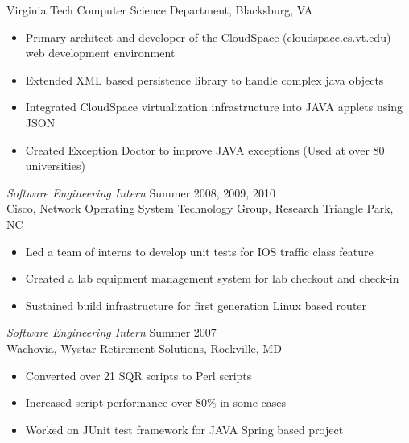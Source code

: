 \documentclass[line,margin]{res}
\begin{document}
\begin{resume}
        Virginia Tech Computer Science Department, Blacksburg, VA
        \begin{itemize} \itemsep -2pt
            \item Primary architect and developer of the CloudSpace (cloudspace.cs.vt.edu) web development environment
            \item Extended XML based persistence library to handle complex java objects
            \item Integrated CloudSpace virtualization infrastructure into JAVA applets using JSON
            \item Created Exception Doctor to improve JAVA exceptions (Used at over 80 universities)
        \end{itemize}
        {\sl Software Engineering Intern} \hfill  Summer 2008, 2009, 2010 \\
           Cisco, Network Operating System Technology Group, Research Triangle Park, NC
              \begin{itemize}  \itemsep -2pt
                   \item Led a team of interns to develop unit tests for IOS traffic class feature
                   \item Created a lab equipment management system for lab checkout and check-in
                   \item Sustained build infrastructure for first generation Linux based router
              \end{itemize}
        {\sl Software Engineering Intern} \hfill  Summer 2007 \\
           Wachovia, Wystar Retirement Solutions, Rockville, MD
              \begin{itemize}  \itemsep -2pt %
                   \item Converted over 21 SQR scripts to Perl scripts
                   \item Increased script performance over 80\% in some cases
                   \item Worked on JUnit test framework for JAVA Spring based project
              \end{itemize}
 

\end{resume}
\end{document}
